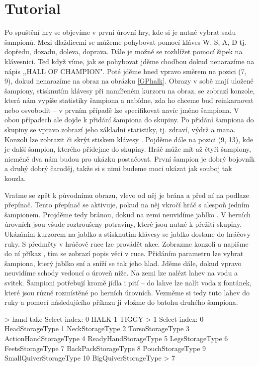 \section{Tutorial}


Po spuštění hry se objevíme v první úrovní hry, kde si je nutné vybrat sadu šampionů. Mezi dlaždicemi se můžeme pohybovat
pomocí kláves W, S, A, D tj. dopředu, dozadu, doleva, doprava. Dále je možné se rozhlížet pomocí šipek na klávesnici.
Teď když víme, jak se pohybovat jděme chodbou dokud nenarazíme na nápis ,,HALL OF CHAMPION". Poté jděme hned 
vpravo směrem na pozici (7, 9), dokud nenarazíme na obraz na obrázku \ref{GPhalk}. Obrazy v sobě mají uložené šampiony, 
stisknutím klávesy  při namířeném kurzoru na obraz, se zobrazí konzole, která nám vypíše statistiky šampiona 
a nabídne, zda ho chceme buď reinkarnovat nebo osvobodit -- v prvním 
případě lze specifikovat navíc jméno šampiona. V obou případech ale dojde k přidání šampiona do skupiny. 
Po přidání šampiona do skupiny se vpravo zobrazí jeho základní statistiky, tj. zdraví, výdrž a mana.
Konzoli lze zobrazit či skrýt stiskem klávesy . Pojděme dále 
na pozici (9, 13), kde je další šampion, kterého přidejme do skupiny. Hráč může mít až 
čtyři šampiony, nicméně dva nám budou pro ukázku postačovat. První šampion je dobrý bojovník
a druhý dobrý čaroděj, takže si s nimi budeme moci ukázat jak souboj tak kouzla.


Vraťme se zpět k původnímu obrazu, vlevo od něj je brána a před ní na podlaze přepínač. Tento přepínač se aktivuje, pokud
na něj vkročí hráč s alespoň jedním šampionem. Projděme tedy bránou, dokud na zemi neuvidíme jablko . 
V herních úrovních jsou všude roztroušeny potraviny, které jsou nutné k přežití skupiny. Ukázáním kurzorem na
jablko a stisknutím klávesy  se jablko dostane do hráčovy ruky. S předměty v hráčově ruce lze provádět akce.
Zobrazme konzoli a napišme do ní příkaz , tím se zobrazí popis věci v ruce. Přidáním parametru 
lze vybrat šampiona, který jablko sní a sníží se tak jeho hlad. Jděme dále, dokud vpravo neuvidíme schody vedoucí
o úroveň níže. Na zemi lze nalézt lahev na vodu a svitek. Šampioni potřebují kromě jídla i pití -- do lahve lze nalít voda
z fontánek, které jsou různě rozmístěné po herních úrovních. Vezměme si tedy tuto lahev do ruky a pomocí následujícího
příkazu ji vložme do batohu druhého šampiona.

\begin{code}
> hand take
Select index:
0 HALK
1 TIGGY
> 1
Select index:
0 HeadStorageType
1 NeckStorageType
2 TorsoStorageType
3 ActionHandStorageType
4 ReadyHandStorageType
5 LegsStorageType
6 FeetsStorageType
7 BackPackStorageType
8 PouchStorageType
9 SmallQuiverStorageType
10 BigQuiverStorageType
> 7
\end{code}

